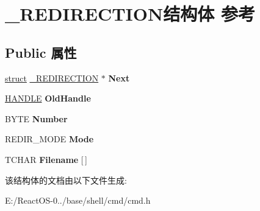 \hypertarget{struct___r_e_d_i_r_e_c_t_i_o_n}{}\section{\+\_\+\+R\+E\+D\+I\+R\+E\+C\+T\+I\+O\+N结构体 参考}
\label{struct___r_e_d_i_r_e_c_t_i_o_n}
\subsection*{Public 属性}
\begin{DoxyCompactItemize}
\item 
\mbox{\label{struct___r_e_d_i_r_e_c_t_i_o_n_aeea33928e5b3324453adbe2dcebdac9e}} 
\hyperlink{interfacestruct}{struct} \hyperlink{struct___r_e_d_i_r_e_c_t_i_o_n}{\+\_\+\+R\+E\+D\+I\+R\+E\+C\+T\+I\+ON} $\ast$ {\bfseries Next}
\item 
\mbox{\label{struct___r_e_d_i_r_e_c_t_i_o_n_a4b542495fdc19a00f30bdb9f8f443bbf}} 
\hyperlink{interfacevoid}{H\+A\+N\+D\+LE} {\bfseries Old\+Handle}
\item 
\mbox{\label{struct___r_e_d_i_r_e_c_t_i_o_n_aacbebaef80f75095151d659acc3c878a}} 
B\+Y\+TE {\bfseries Number}
\item 
\mbox{\label{struct___r_e_d_i_r_e_c_t_i_o_n_a12554727db0d2432e49220480ac1e86d}} 
R\+E\+D\+I\+R\+\_\+\+M\+O\+DE {\bfseries Mode}
\item 
\mbox{\label{struct___r_e_d_i_r_e_c_t_i_o_n_ac5d87d404b40572c6f2a7192436b9192}} 
T\+C\+H\+AR {\bfseries Filename} \mbox{[}$\,$\mbox{]}
\end{DoxyCompactItemize}


该结构体的文档由以下文件生成\+:\begin{DoxyCompactItemize}
\item 
E\+:/\+React\+O\+S-\/0../base/shell/cmd/cmd.\+h\end{DoxyCompactItemize}

